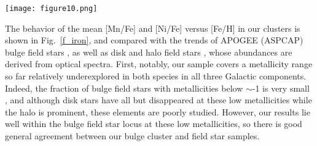 \documentclass[onecolumn]{aa}
\begin{document}
\begin{figure*}
\centering
   \texttt{[image: figure10.png]}
      \caption{Mean abundance ratio of the Fe-peak elements Mn (top) and Ni (bottom) for each of our clusters (filled squares with error bars), compared with 
APOGEE bulge stars (asterisks - Rojas-Arriagada et al. 2020) and the general trend of disk/halo stars \citep[circles-][]{Reddy2003, Reddy2006, Battistini2015, Lomaeva2019}. Our BGCs generally follow the bulge field-star trend.
      }
    \label{f_iron}
\end{figure*}


The behavior of the mean [Mn/Fe] and [Ni/Fe] versus [Fe/H] in our clusters is shown in Fig.~\ref{f_iron}, and compared with the trends of APOGEE (ASPCAP) bulge field stars \citep{Rojas-Arriagada2020}, as well as disk and halo field stars \citep{Reddy2003, Reddy2006, Battistini2015, Lomaeva2019}, whose abundances are derived from optical spectra. First, notably, our sample covers a metallicity range so far relatively underexplored in both species in all three Galactic components. Indeed, the fraction of bulge field stars with metallicities below $\sim$-1 is very small \citep{Rojas-Arriagada2020}, and although disk stars have all but disappeared at these low metallicities while the halo is prominent, these elements are poorly studied. However, our results lie well within the bulge field star locus at these low metallicities, so there is good general agreement between our bulge cluster and field star samples.
\end{document}
